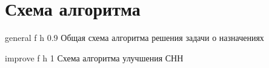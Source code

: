 \newpage

\section{Схема алгоритма}

    {general}
    {f}
    {h}
    {0.9\textwidth}
    {Общая схема алгоритма решения задачи о назначениях}
    
\newpage

    {improve}
    {f}
    {h}
    {1\textwidth}
    {Схема алгоритма улучшения СНН}
